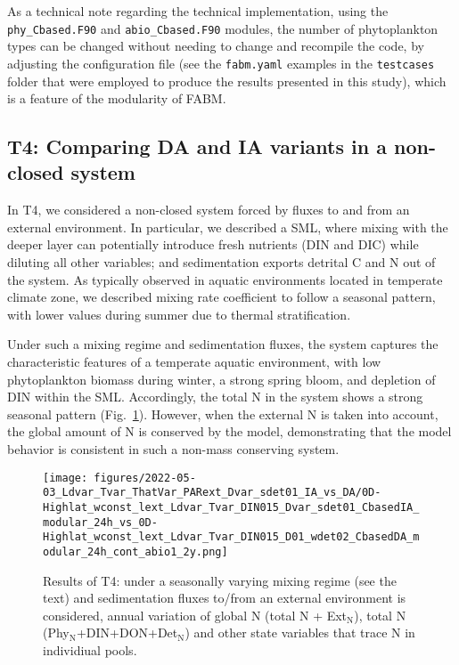 \documentclass[gmd, manuscript]{copernicus}
\begin{document}
As a technical note regarding the technical implementation, using the \verb|phy_Cbased.F90| and \verb|abio_Cbased.F90| modules, the number of phytoplankton types can be changed without needing to change and recompile the code, by adjusting the configuration file (see the \verb|fabm.yaml| examples in the \verb|testcases| folder that were employed to produce the results presented in this study), which is a feature of the modularity of FABM\@.


\FloatBarrier%
\subsection{T4: Comparing DA and IA variants in a non-closed system}\label{s.resT4}

In T4, we considered a non-closed system forced by fluxes to and from an external environment. In particular, we described a SML, where mixing with the deeper layer can potentially introduce  fresh nutrients (DIN and DIC) while diluting all other variables; and sedimentation exports detrital C and N out of the system. As typically observed in aquatic environments located in temperate climate zone, we described mixing rate coefficient to follow a seasonal pattern, with lower values during summer due to thermal stratification. 

Under such a mixing regime and sedimentation fluxes, the system captures the characteristic features of a temperate aquatic environment, with low phytoplankton biomass during winter, a strong spring bloom, and depletion of DIN within the SML. Accordingly, the total N in the system shows a strong seasonal pattern (Fig.~\ref{f.T4res}). However, when the external N is taken into account, the global amount of N is conserved by the model, demonstrating that the model behavior is consistent in such a non-mass conserving system.

\begin{figure}[ht!]
\texttt{[image: figures/2022-05-03\_Ldvar\_Tvar\_ThatVar\_PARext\_Dvar\_sdet01\_IA\_vs\_DA/0D-Highlat\_wconst\_lext\_Ldvar\_Tvar\_DIN015\_Dvar\_sdet01\_CbasedIA\_modular\_24h\_vs\_0D-Highlat\_wconst\_lext\_Ldvar\_Tvar\_DIN015\_D01\_wdet02\_CbasedDA\_modular\_24h\_cont\_abio1\_2y.png]}
\caption{Results of T4: under a seasonally varying mixing regime (see the text) and sedimentation fluxes to/from an external environment is considered, annual variation of global N (total N + Ext$_{\text{N}}$), total N (Phy$_{\text{N}}$+DIN+DON+Det$_{\text{N}}$) and other state variables that trace N in individiual pools.\label{f.T4res}}
\end{figure}
\end{document}

